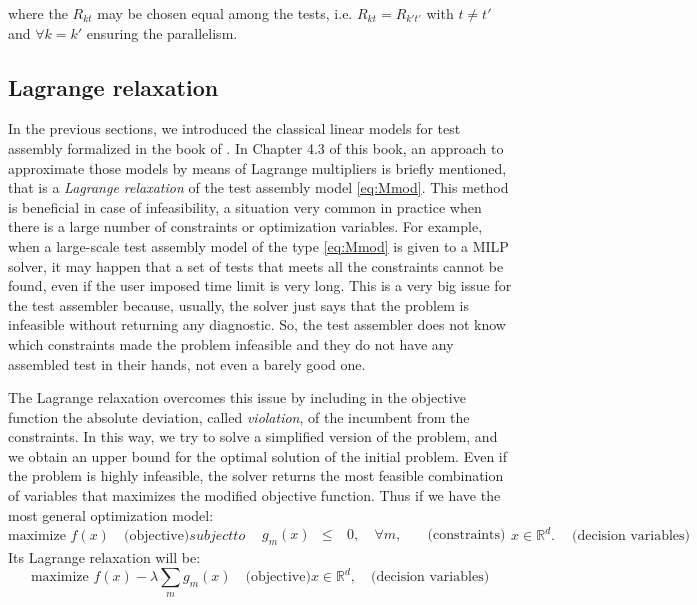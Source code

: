 \noindent where the $R_{kt}$ may be chosen equal among the tests, i.e. $R_{kt}=R_{k't'}$ with $t \ne t'$ and $\forall k=k'$ ensuring the parallelism.

\subsection{Lagrange relaxation}\label{sec:lagrange}

In the previous sections, we introduced the classical linear models for test assembly formalized in the book of \textcite{VDL2005}. In Chapter 4.3 of this book, an approach to approximate those models by means of Lagrange multipliers is briefly mentioned, that is a \emph{Lagrange relaxation} of the test assembly model \eqref{eq:Mmod}.
This method is beneficial in case of infeasibility, a situation very common in practice when there is a large number of constraints or optimization variables. For example, when a large-scale test assembly model of the type \eqref{eq:Mmod} is given to a MILP solver, it may happen that a set of tests that meets all the constraints cannot be found, even if the user imposed time limit is very long. This is a very big issue for the test assembler because, usually, the solver just says that the problem is infeasible without returning any diagnostic. So, the test assembler does not know which constraints made the problem infeasible and they do not have any assembled test in their hands, not even a barely good one. 

The Lagrange relaxation \parencite{fisher1981lagrangian} overcomes this issue by including in the objective function the absolute deviation, called \emph{violation}, of the incumbent from the constraints. In this way, we try to solve a simplified version of the problem, and we obtain an upper bound for the optimal solution of the initial problem. Even if the problem is highly infeasible, the solver returns the most feasible combination of variables that maximizes the modified objective function.
Thus if we have the most general optimization model:
\begin{subequations}\label{eq:optModel}
	\begin{equation}
	\mbox{maximize } {f(x)} \quad \mbox{(objective)}
	\end{equation}
	subject to    
	\begin{alignat}{3}
	&g_m(x) &\le \ & 0 , \ & \forall m, \quad & \mbox{(constraints)}
	\end{alignat}
	\begin{equation*}
	x \in \mathbb{R}^d. \ \quad \mbox{(decision variables)}
	\end{equation*}
\end{subequations}
Its Lagrange relaxation will be:
\begin{subequations}\label{eq:LRoptModel}
	\begin{equation}
	\mbox{maximize } {f(x)-\lambda\sum_m g_m(x)} \quad \mbox{(objective)}
	\end{equation}
	\begin{equation*}
	x \in \mathbb{R}^d, \quad \mbox{(decision variables)}
	\end{equation*}
\end{subequations}

